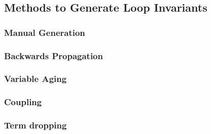 \subsection{Methods to Generate Loop Invariants}

\subsubsection{Manual Generation}

\cite{broda-loop-tech}

\subsubsection{Backwards Propagation}

\cite{infer-postconditions}
\cite{infer-dynamic}

\subsubsection{Variable Aging}

\cite{infer-postconditions}
\cite{infer-dynamic}

\subsubsection{Coupling}

\cite{infer-postconditions}
\cite{infer-dynamic}

\subsubsection{Term dropping}

\cite{infer-postconditions}
\cite{infer-dynamic}

\cite{struct-induction}

